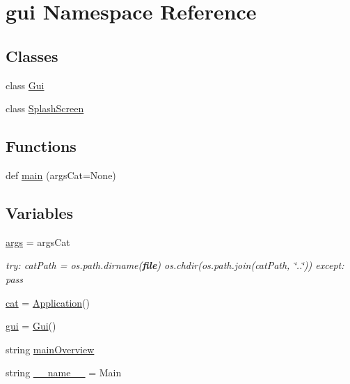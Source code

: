 \hypertarget{namespacegui}{}\section{gui Namespace Reference}
\label{namespacegui}
\subsection*{Classes}
\begin{DoxyCompactItemize}
\item 
class \hyperlink{classgui_1_1Gui}{Gui}
\item 
class \hyperlink{classgui_1_1SplashScreen}{Splash\+Screen}
\end{DoxyCompactItemize}
\subsection*{Functions}
\begin{DoxyCompactItemize}
\item 
def \hyperlink{namespacegui_a24d9f88c60ee52fd5381ea6f83ca2adb}{main} (args\+Cat=None)
\end{DoxyCompactItemize}
\subsection*{Variables}
\begin{DoxyCompactItemize}
\item 
\hyperlink{namespacegui_ad76e7b18f23e1dbbdee8133fc097dbc9}{args} = args\+Cat
\begin{DoxyCompactList}\small\item\em try\+: cat\+Path = os.\+path.\+dirname({\bfseries file}) os.\+chdir(os.\+path.\+join(cat\+Path, \char`\"{}..\char`\"{})) except\+: pass \end{DoxyCompactList}\item 
\hyperlink{namespacegui_a3a26ff3a3c51b7dea987a548f1ca8109}{cat} = \hyperlink{classApplication}{Application}()
\item 
\hyperlink{namespacegui_a6de765688c7629408f05477a6ffa24b7}{gui} = \hyperlink{classgui_1_1Gui}{Gui}()
\item 
string \hyperlink{namespacegui_ab89eb8f7c2d459b1cde0cd06cdc5cfd3}{main\+Overview}
\item 
string \hyperlink{namespacegui_af1dfb6646e7fc2148ca23c3900a8b5e3}{\+\_\+\+\_\+name\+\_\+\+\_\+} = \textquotesingle{}Main\textquotesingle{}
\end{DoxyCompactItemize}


